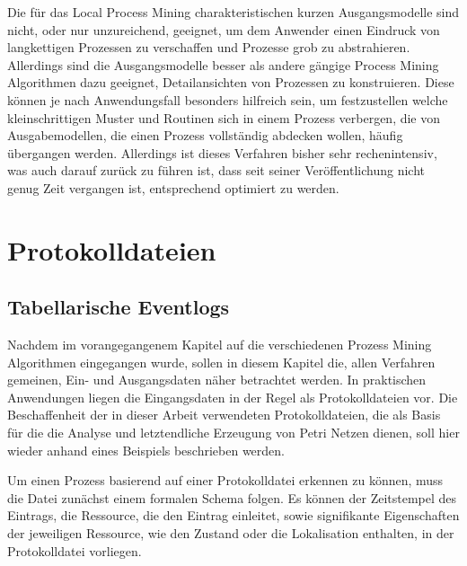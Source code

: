 Die für das Local Process Mining charakteristischen kurzen Ausgangsmodelle sind nicht, oder nur unzureichend, geeignet, um dem Anwender einen Eindruck von langkettigen Prozessen zu verschaffen und Prozesse grob zu abstrahieren. Allerdings sind die Ausgangsmodelle besser als andere gängige Process Mining Algorithmen dazu geeignet, Detailansichten von Prozessen zu konstruieren. 
Diese können je nach Anwendungsfall besonders hilfreich sein, um festzustellen welche kleinschrittigen Muster und Routinen sich in einem Prozess verbergen, die von Ausgabemodellen, die einen Prozess vollständig abdecken wollen, häufig übergangen werden. Allerdings ist dieses Verfahren bisher sehr rechenintensiv, was auch darauf zurück zu führen ist, dass seit seiner Veröffentlichung nicht genug Zeit vergangen ist, entsprechend optimiert zu werden.


\section{Protokolldateien}
\subsection{Tabellarische Eventlogs}
Nachdem im vorangegangenem Kapitel auf die verschiedenen Prozess Mining Algorithmen eingegangen wurde, sollen in diesem Kapitel die, allen Verfahren gemeinen, Ein- und Ausgangsdaten näher betrachtet werden.
In praktischen Anwendungen liegen die Eingangsdaten in der Regel als Protokolldateien vor. Die Beschaffenheit der in dieser Arbeit verwendeten  Protokolldateien, die als Basis für die die Analyse und letztendliche Erzeugung von Petri Netzen dienen, soll hier wieder anhand eines Beispiels beschrieben werden.

Um einen Prozess basierend auf einer Protokolldatei erkennen zu können, muss die Datei zunächst einem formalen Schema folgen. Es können der Zeitstempel des Eintrags, die Ressource, die den Eintrag einleitet, sowie signifikante Eigenschaften der jeweiligen Ressource, wie den Zustand oder die Lokalisation enthalten, in der Protokolldatei vorliegen.

